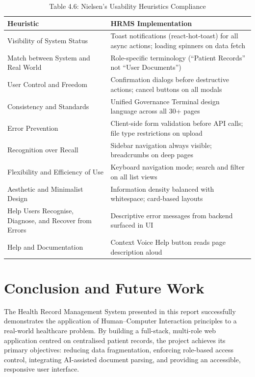 \documentclass[12pt,a4paper]{report}
\begin{document}
\begin{table}[H]
\centering
\caption{Table 4.6: Nielsen's Usability Heuristics Compliance}
\begin{tabular}{p{5.5cm}p{7cm}}
\toprule
\textbf{Heuristic} & \textbf{HRMS Implementation} \\
\midrule
Visibility of System Status & Toast notifications (react-hot-toast) for all async actions; loading spinners on data fetch \\
Match between System and Real World & Role-specific terminology (``Patient Records'' not ``User Documents'') \\
User Control and Freedom & Confirmation dialogs before destructive actions; cancel buttons on all modals \\
Consistency and Standards & Unified Governance Terminal design language across all 30+ pages \\
Error Prevention & Client-side form validation before API calls; file type restrictions on upload \\
Recognition over Recall & Sidebar navigation always visible; breadcrumbs on deep pages \\
Flexibility and Efficiency of Use & Keyboard navigation mode; search and filter on all list views \\
Aesthetic and Minimalist Design & Information density balanced with whitespace; card-based layouts \\
Help Users Recognise, Diagnose, and Recover from Errors & Descriptive error messages from backend surfaced in UI \\
Help and Documentation & Context Voice Help button reads page description aloud \\
\bottomrule
\end{tabular}
\end{table}

\chapter{Conclusion and Future Work}

The Health Record Management System presented in this report successfully demonstrates the application of Human--Computer Interaction principles to a real-world healthcare problem. By building a full-stack, multi-role web application centred on centralised patient records, the project achieves its primary objectives: reducing data fragmentation, enforcing role-based access control, integrating AI-assisted document parsing, and providing an accessible, responsive user interface.
\end{document}
